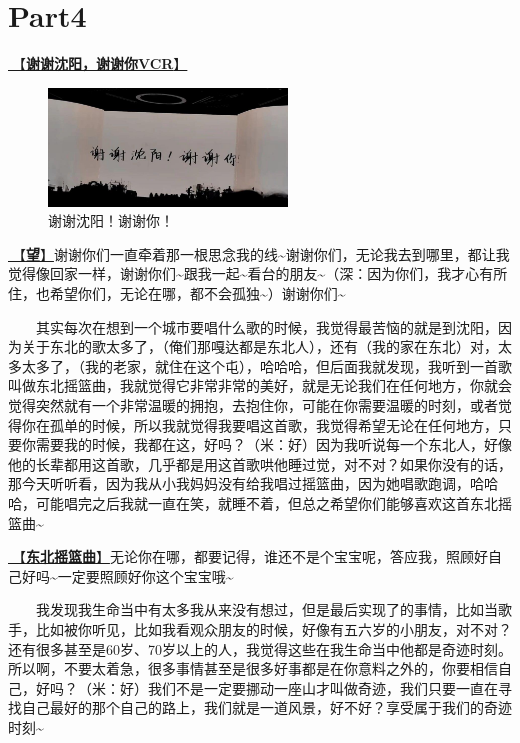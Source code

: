 \documentclass[]{ctexbook}
\begin{document}
\section{Part4}\label{shenyang-20240907-part4}

\hyperref[thank-you-vcr]{🎥【\textbf{谢谢沈阳，谢谢你VCR}】}

\begin{figure}

{\centering \includegraphics[width=180pt]{img/shenyang20240907/thank-shenyang} 

}

\caption{谢谢沈阳！谢谢你！}\label{fig:unnamed-chunk-78}
\end{figure}

\hyperref[hope]{🎵【\textbf{望}】}谢谢你们一直牵着那一根思念我的线\textasciitilde 谢谢你们，无论我去到哪里，都让我觉得像回家一样，谢谢你们\textasciitilde 跟我一起\textasciitilde 看台的朋友\textasciitilde（深：因为你们，我才心有所住，也希望你们，无论在哪，都不会孤独\textasciitilde）谢谢你们\textasciitilde{}

  其实每次在想到一个城市要唱什么歌的时候，我觉得最苦恼的就是到沈阳，因为关于东北的歌太多了，（俺们那嘎达都是东北人），还有（我的家在东北）对，太多太多了，（我的老家，就住在这个屯），哈哈哈，但后面我就发现，我听到一首歌叫做东北摇篮曲，我就觉得它非常非常的美好，就是无论我们在任何地方，你就会觉得突然就有一个非常温暖的拥抱，去抱住你，可能在你需要温暖的时刻，或者觉得你在孤单的时候，所以我就觉得我要唱这首歌，我觉得希望无论在任何地方，只要你需要我的时候，我都在这，好吗？（米：好）因为我听说每一个东北人，好像他的长辈都用这首歌，几乎都是用这首歌哄他睡过觉，对不对？如果你没有的话，那今天听听看，因为我从小我妈妈没有给我唱过摇篮曲，因为她唱歌跑调，哈哈哈，可能唱完之后我就一直在笑，就睡不着，但总之希望你们能够喜欢这首东北摇篮曲\textasciitilde{}

\hyperref[lullaby]{🎵【\textbf{东北摇篮曲}】}无论你在哪，都要记得，谁还不是个宝宝呢，答应我，照顾好自己好吗\textasciitilde 一定要照顾好你这个宝宝哦\textasciitilde{}

  我发现我生命当中有太多我从来没有想过，但是最后实现了的事情，比如当歌手，比如被你听见，比如我看观众朋友的时候，好像有五六岁的小朋友，对不对？还有很多甚至是60岁、70岁以上的人，我觉得这些在我生命当中他都是奇迹时刻。所以啊，不要太着急，很多事情甚至是很多好事都是在你意料之外的，你要相信自己，好吗？（米：好）我们不是一定要挪动一座山才叫做奇迹，我们只要一直在寻找自己最好的那个自己的路上，我们就是一道风景，好不好？享受属于我们的奇迹时刻\textasciitilde{}
\end{document}

